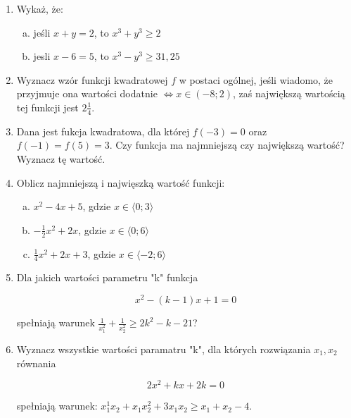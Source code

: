 \documentclass[12pt,a4paper]{article}
\begin{document}
	
	\begin{enumerate}[1.]
		\item Wykaż, że:
		
		\begin{enumerate}[a)]
			\item jeśli $x+y=2$, to $x^3+y^3\geq 2$
			\item jesli $x-6=5$, to $x^3-y^3\geq31,25$
		\end{enumerate}
	
	\item Wyznacz wzór funkcji kwadratowej $f$ w postaci ogólnej, jeśli wiadomo, że przyjmuje ona wartości dodatnie $\Leftrightarrow x\in (-8;2)$, zaś największą wartością tej funkcji jest $2\frac{1}{4}$.
	
	\item Dana jest fukcja kwadratowa, dla której $f(-3)=0$ oraz $f(-1)=f(5)=3$. Czy funkcja ma najmniejszą czy największą wartość? Wyznacz tę wartość.
	
	\item Oblicz najmniejszą i najwięszką wartość funkcji:
	\begin{enumerate}[a)]
		\item $x^2-4x+5$, gdzie $x\in\langle0;3\rangle$
		\item $-\frac{1}{2}x^2+2x$, gdzie $x\in\langle0;6\rangle$
		\item $\frac{1}{4}x^2+2x+3$, gdzie $x\in\langle-2;6\rangle$
	\end{enumerate} 

	\item Dla jakich wartości parametru "k" funkcja
	
	$$x^2-(k-1)x + 1 = 0$$ 
	
	spełniają warunek $\frac{1}{x_1^2}+\frac{1}{x_2^2}\geq 2k^2-k-21$?
	
	\item Wyznacz wszystkie wartości paramatru "k", dla których rozwiązania $x_1,x_2$ równania
	
	$$2x^2+kx+2k=0$$
	
	spełniają warunek: $x_1^1 x_2+x_1 x_2^2 + 3x_1x_2\geq x_1+x_2-4$.
		
	\end{enumerate}
\end{document}
